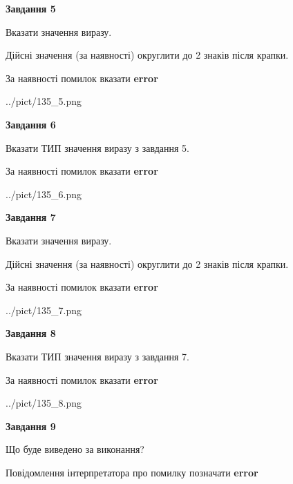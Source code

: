 \documentclass[11pt, ukrainian]{article}
\begin{document}
{\begin {large}
{\begin {center}\textbf{Завдання 5}\end {center}}\par
Вказати значення виразу. \par
Дійсні значення (за наявності) округлити до 2 знаків після крапки. \par
За наявності помилок вказати \textbf{error}

\begin{center}
	{../pict/135_5.png}
\end{center}
\newpage

{\begin {center}\textbf{Завдання 6}\end {center}}\par
Вказати ТИП значення виразу з завдання 5. \par
За наявності помилок вказати \textbf{error}

\begin{center}
	{../pict/135_6.png}
\end{center}
\newpage

{\begin {center}\textbf{Завдання 7}\end {center}}\par
Вказати значення виразу. \par
Дійсні значення (за наявності) округлити до 2 знаків після крапки. \par
За наявності помилок вказати \textbf{error}

\begin{center}
	{../pict/135_7.png}
\end{center}
\newpage

{\begin {center}\textbf{Завдання 8}\end {center}}\par
Вказати ТИП значення виразу з завдання 7. \par
За наявності помилок вказати \textbf{error}

\begin{center}
	{../pict/135_8.png}
\end{center}
\newpage

{\begin {center}\textbf{Завдання 9}\end {center}}\par
Що буде виведено за виконання? \par
Повідомлення інтерпретатора про помилку позначати \textbf{error}


\end{large}}
\end{document}
